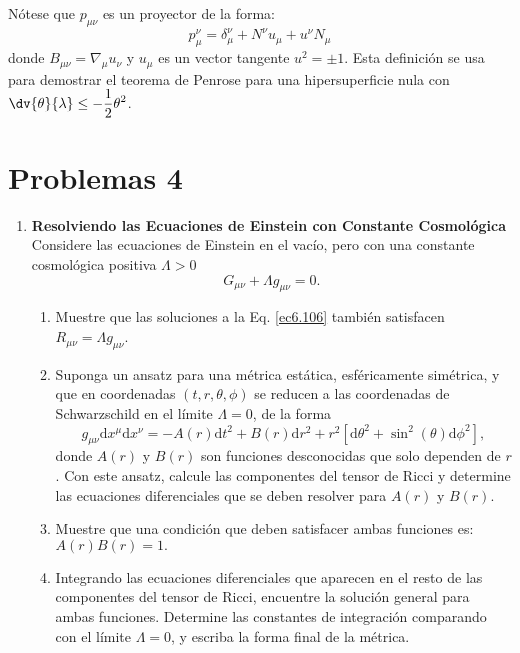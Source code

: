 \documentclass[../main]{subfiles}
\begin{document}
\begin{adjustwidth}{0pt}{-100pt}
Nótese que $p_{\mu\nu}$ es un proyector de la forma:
\begin{equation}
    p^{\nu}_{\mu}=\delta^{\nu}_{\mu}+N^{\nu}u_{\mu}+u^{\nu}N_{\mu}
\end{equation}
donde $B_{\mu\nu}=\nabla_{\mu}u_{\nu}$ y $u_{\mu}$ es un vector tangente $u^2=\pm 1$. Esta definición se usa para demostrar el teorema de Penrose para una hipersuperficie nula con $\displaystyle \dv{\theta}{\lambda}\leq -\dfrac{1}{2}\theta^2$.

\section*{Problemas 4}

\begin{enumerate}
    \item \textbf{Resolviendo las Ecuaciones de Einstein con Constante Cosmológica}
    Considere las ecuaciones de Einstein en el vacío, pero con una constante cosmológica positiva $\Lambda >0$
    \begin{equation}
        G_{\mu\nu}+\Lambda g_{\mu\nu}=0.
        \label{ec6.106}
    \end{equation}
    \begin{enumerate}[label=(\alph*)]
        \item Muestre que las soluciones a la Eq. \eqref{ec6.106} también satisfacen $R_{\mu\nu}=\Lambda g_{\mu\nu}$.
        \item Suponga un ansatz para una métrica estática, esféricamente simétrica, y que en coordenadas $(t, r, \theta, \phi)$ se reducen a las coordenadas de Schwarzschild en el límite $\Lambda =0$, de la forma
        \begin{equation}
            g_{\mu\nu}\mathrm{d}x^{\mu}\mathrm{d}x^{\nu}=-A(r)\mathrm{d}t^2+B(r)\mathrm{d}r^2+r^2\left[\mathrm{d}\theta^2+\sin^2(\theta)\mathrm{d}\phi^2\right],
        \end{equation}
        donde $A(r)$ y $B(r)$ son funciones desconocidas que solo dependen de $r$. Con este ansatz, calcule las componentes del tensor de Ricci y determine las ecuaciones diferenciales que se deben resolver para $A(r)$ y $B(r)$.
        \item Muestre que una condición que deben satisfacer ambas funciones es: $A(r)B(r)=1.$
        \item Integrando las ecuaciones diferenciales que aparecen en el resto de las componentes del tensor de Ricci, encuentre la solución general para ambas funciones. Determine las constantes de integración comparando con el límite $\Lambda =0$, y escriba la forma final de la métrica.

\end{enumerate}
\end{enumerate}
\end{adjustwidth}
\end{document}
